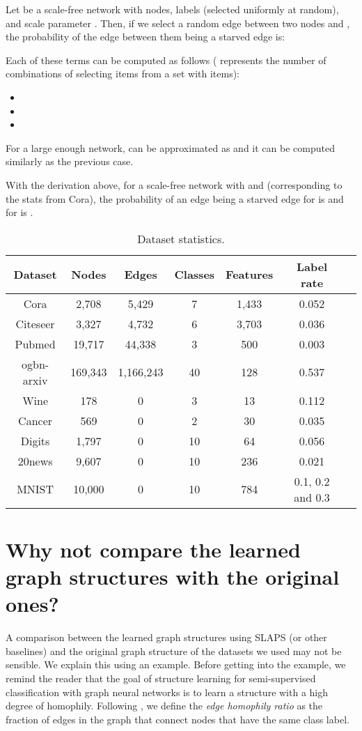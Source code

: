 \documentclass{article}
\begin{document}
Let  be a scale-free network with  nodes,  labels (selected uniformly at random), and scale parameter . Then, if we select a random edge between two nodes  and , the probability of the edge between them being a starved edge is:




Each of these terms can be computed as follows ( represents the number of combinations of selecting  items from a set with  items):

\begin{itemize}
    \item 
    \item 
    \item 
\end{itemize}

For a large enough network, 
can be approximated as   and it can be computed similarly as the previous case.

With the derivation above, for a scale-free network with  and  (corresponding to the stats from Cora), the probability of an edge being a starved edge for  is  and for  is  .

\begin{table*}
\caption{Dataset statistics.}
\label{tab:datasets}
\begin{center}
\begin{tabular}{c|cccccc}
Dataset & Nodes & Edges & Classes & Features & Label rate \\ \hline
Cora & 2,708 & 5,429 & 7 & 1,433 & 0.052 \\
Citeseer & 3,327 & 4,732 & 6 & 3,703 & 0.036\\
Pubmed & 19,717 & 44,338 & 3 & 500 & 0.003\\
ogbn-arxiv & 169,343 & 1,166,243 & 40 & 128 & 0.537 \\
Wine & 178 & 0 & 3 & 13 & 0.112\\
Cancer & 569 & 0 & 2 & 30 & 0.035\\
Digits & 1,797 & 0 & 10 & 64 & 0.056\\
20news & 9,607 & 0 & 10 & 236 & 0.021\\
MNIST & 10,000 & 0 & 10 & 784 & 0.1, 0.2 and 0.3 \\
\end{tabular}
\end{center}
\end{table*}

\section{Why not compare the learned graph structures with the original ones?}
A comparison between the learned graph structures using SLAPS (or other baselines) and the original graph structure of the datasets we used may not be sensible. We explain this using an example. Before getting into the example, 
we remind the reader that the goal of structure learning for semi-supervised classification with graph neural networks is to learn a structure with a high degree of homophily. Following \cite{zhu2020beyond}, we define the \emph{edge homophily ratio} as the fraction of edges in the
graph that connect nodes that have the same class label. 
\end{document}
